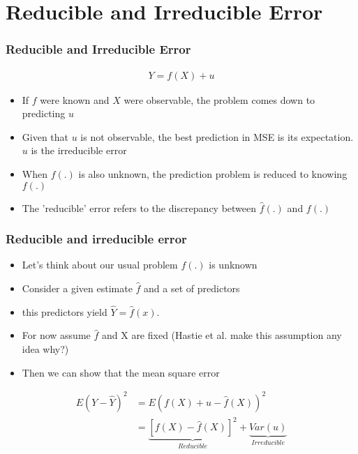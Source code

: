 \documentclass[
  shownotes,
  xcolor={svgnames},
  hyperref={colorlinks,citecolor=DarkBlue,linkcolor=DarkRed,urlcolor=DarkBlue}
  ]{beamer}
\begin{document}
\section{Reducible and Irreducible Error}
\begin{frame}
\frametitle{Reducible and Irreducible Error}



\begin{align}
  Y=f(X)+u 
\end{align}


\begin{itemize}
    \item  If $f$ were known and $X$ were observable, the problem comes down to predicting $u$
    \item  Given that $u$ is not observable, the best prediction in MSE is its expectation. $u$ is the irreducible error
    \item  When $f(.)$ is also unknown, the prediction problem is reduced to knowing $f(.)$
    \item  The 'reducible' error refers to the discrepancy between   $\hat f(.)$ and $f(.)$

\end{itemize}

\end{frame}
\begin{frame}
\frametitle{Reducible and irreducible error}

\begin{itemize}
\item Let's think about our usual problem $f(.)$ is unknown
\item Consider a given estimate $\hat f$ and a set of predictors
\item this predictors yield $\hat Y = \hat f(x)$. 
\item For now assume $\hat f$ and X are fixed {\tiny (Hastie et al. make this assumption any idea why?)}
\item Then we can show that the mean square error
\end{itemize}

\begin{align}
E(Y-\hat Y)^2 &= E(f(X)+u - \hat f(X))^2 \\
      &= \underset{Reducible}{\underbrace{[f(X)-\hat{f}(X)]^{2}}}+\underset{Irreducible}{\underbrace{Var(u)}}
\end{align}

\end{frame}
\end{document}

